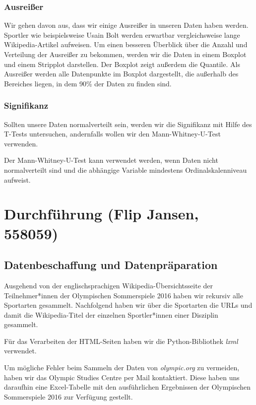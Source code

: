 \documentclass[11pt]{article}
\begin{document}
\subsubsection{Ausreißer}
Wir gehen davon aus, dass wir einige Ausreißer in unseren Daten haben werden. Sportler wie beispielsweise Usain Bolt werden erwartbar vergleichsweise lange Wikipedia-Artikel aufweisen. Um einen besseren Überblick über die Anzahl und Verteilung der Ausreißer zu bekommen, werden wir die Daten in einem Boxplot und einem Stripplot darstellen. Der Boxplot zeigt außerdem die Quantile. Als Ausreißer werden alle Datenpunkte im Boxplot dargestellt, die außerhalb des Bereiches liegen, in dem 90\% der Daten zu finden sind.

\subsubsection{Signifikanz}
Sollten unsere Daten normalverteilt sein, werden wir die Signifikanz mit Hilfe des T-Tests untersuchen, andernfalls wollen wir den Mann-Whitney-U-Test verwenden.

Der Mann-Whitney-U-Test kann verwendet werden, wenn Daten nicht normalverteilt sind und die abhängige Variable mindestens Ordinalskalenniveau aufweist.


\section{Durchführung (Flip Jansen, 558059)}

\subsection{Datenbeschaffung und Datenpräparation}
Ausgehend von der englischsprachigen Wikipedia-Übersichtsseite der Teilnehmer*innen der Olympischen Sommerspiele 2016 \parencite{wikiOlympicComp} haben wir rekursiv alle Sportarten gesammelt. Nachfolgend haben wir über die Sportarten die URLs und damit die Wikipedia-Titel der einzelnen Sportler*innen einer Disziplin gesammelt.

Für das Verarbeiten der HTML-Seiten haben wir die Python-Bibliothek \textit{lxml} \parencite{lxml} verwendet.

Um mögliche Fehler beim Sammeln der Daten von \textit{olympic.org} zu vermeiden, haben wir das Olympic Studies Centre per Mail kontaktiert. Diese haben uns daraufhin eine Excel-Tabelle mit den ausführlichen Ergebnissen der Olympischen Sommerspiele 2016 zur Verfügung gestellt.
\end{document}
